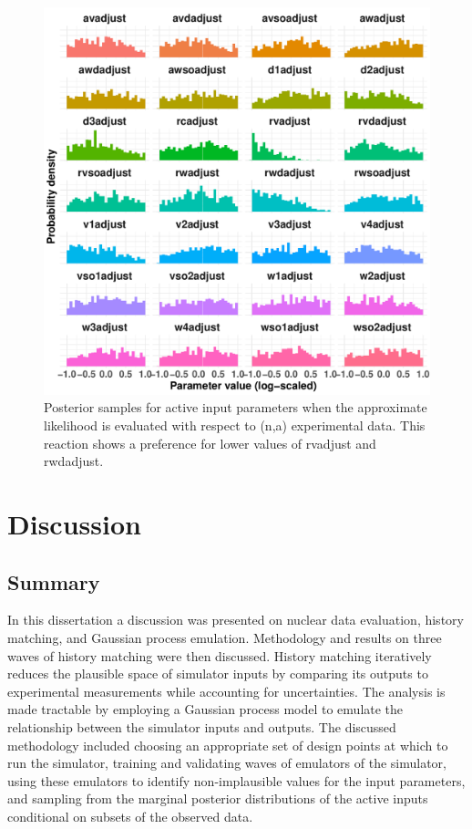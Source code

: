 \documentclass[
  12pt,
  a4paper,
  twoside]{book}
\begin{document}
\begin{figure}[H]

{\centering \includegraphics[width=0.8\linewidth]{figures/na_posterior} 

}

\caption{Posterior samples for active input parameters when the approximate likelihood is evaluated with respect to (n,a) experimental data. This reaction shows a preference for lower values of rvadjust and rwdadjust.}\label{fig:na-posterior}
\end{figure}

\hypertarget{Discussion}{%
\chapter{Discussion}\label{Discussion}}

\hypertarget{summary}{%
\section{Summary}\label{summary}}

In this dissertation a discussion was presented on nuclear data evaluation, history matching, and Gaussian process emulation. Methodology and results on three waves of history matching were then discussed. History matching iteratively reduces the plausible space of simulator inputs by comparing its outputs to experimental measurements while accounting for uncertainties. The analysis is made tractable by employing a Gaussian process model to emulate the relationship between the simulator inputs and outputs. The discussed methodology included choosing an appropriate set of design points at which to run the simulator, training and validating waves of emulators of the simulator, using these emulators to identify non-implausible values for the input parameters, and sampling from the marginal posterior distributions of the active inputs conditional on subsets of the observed data.
\end{document}
